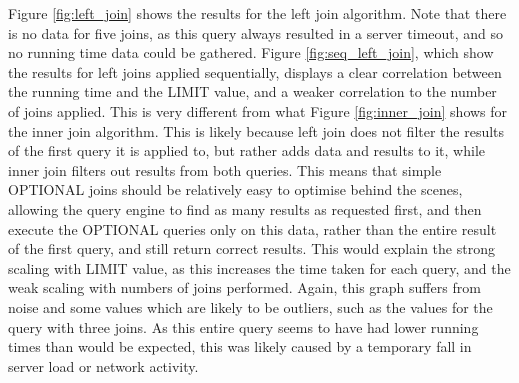 \documentclass[10pt,a4paper]{article}
\begin{document}
	Figure \ref{fig:left_join} shows the results for the left join algorithm. Note that there is no data for five joins, as this query always resulted in a server timeout, and so no running time data could be gathered. Figure \ref{fig:seq_left_join}, which show the results for left joins applied sequentially, displays a clear correlation between the running time and the LIMIT value, and a weaker correlation to the number of joins applied. This is very different from what Figure \ref{fig:inner_join} shows for the inner join algorithm. This is likely because left join does not filter the results of the first query it is applied to, but rather adds data and results to it, while inner join filters out results from both queries. This means that simple OPTIONAL joins should be relatively easy to optimise behind the scenes, allowing the query engine to find as many results as requested first, and then execute the OPTIONAL queries only on this data, rather than the entire result of the first query, and still return correct results. This would explain the strong scaling with LIMIT value, as this increases the time taken for each query, and the weak scaling with numbers of joins performed. Again, this graph suffers from noise and some values which are likely to be outliers, such as the values for the query with three joins. As this entire query seems to have had lower running times than would be expected, this was likely caused by a temporary fall in server load or network activity.
	
\end{document}
